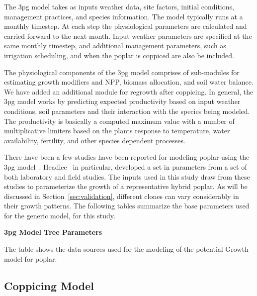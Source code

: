 \documentclass[10pt]{article}
\begin{document}
The \ac{3pg} model takes as inputs weather data, site factors, initial
conditions, management practices, and species information.  The model
typically runs at a monthly timestep. At each step the physiological
parameters are calculated and carried forward to the next month. Input
weather parameters are specified at the same monthly timestep, and
additional management parameters, such as irrigation scheduling, and
when the poplar is coppiced are also be included.

The physiological components of the \ac{3pg} model comprises of
sub-modules for estimating growth modifiers and \ac{NPP}, biomass
allocation, and soil water balance.  We have added an additional
module for regrowth after coppicing.  In general, the \ac{3pg} model
works by predicting expected productivity based on input weather
conditions, soil parameters and their interaction with the species
being modeled.  The productivity is basically a computed maximum value
with a number of multiplicative limiters based on the plants response
to temperature, water availability, fertility, and other species
dependent processes.


There have been a few studies have been reported for modeling poplar
using the \ac{3pg} model~\cite{Amichev2010,Headlee2012}.
Headlee~\cite{Headlee2012} in particular, developed a set in \pop
parameters from a set of both laboratory and field studies.  The
inputs used in this study draw from these studies to parameterize the
growth of a representative hybrid poplar.  As will be discussed in
Section~\ref{sec:validation}, different \pop clones can vary
considerably in their growth patterns.  The following tables summarize
the base parameters used for the generic \pop model, for this study.

\begin{table}[!ht]
\caption{\textbf{\ac{3pg} Model Tree Parameters}}
%

\begin{flushleft}The table shows the data sources used for the
  modeling of the potential Growth model for poplar.
\end{flushleft}
\label{tab:3pg-tree}
 \end{table}

\subsection*{Coppicing Model}
\label{sec:coppicing-model}
\end{document}

